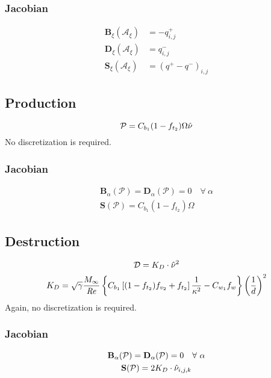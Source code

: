 \documentclass{SelimArticle}
\begin{document}
\subsubsection{Jacobian}
\begin{align*}
    \mathbf{B}_\xi(\mathcal{A}_\xi) &= -q^+_{i,j}\\
    \mathbf{D}_\xi(\mathcal{A}_\xi) &= q^-_{i,j}\\
    \mathbf{S}_\xi(\mathcal{A}_\xi) &= \left(q^+ - q^-\right)_{i,j}
\end{align*}


\subsection{Production}
$$
\mathcal{P} = C_{b_1}(1 - f_{t_2})\Omega\hat{\nu}
$$
No discretization is required.
\subsubsection{Jacobian}
\begin{gather*}
    \mathbf{B}_\alpha(\mathcal{P}) = \mathbf{D}_\alpha(\mathcal{P}) = 0 \quad \forall ~ \alpha\\
    \mathbf{S}(\mathcal{P}) = C_{b_1}(1 - f_{t_2})\Omega
\end{gather*}


\subsection{Destruction}
\begin{gather*}
    \mathcal{D} = K_D\cdot \hat{\nu}^2\\
    K_D =  \sqrt{\gamma}\frac{M_\infty}{\mathit{Re}} \left\{
        C_{b_1}\left[(1 - f_{t_2})f_{v_2} + f_{t_2}\right]\frac{1}{\kappa^2} - C_{w_1}f_w
    \right\} \left( \frac{1}{d}\right)^2
\end{gather*}
Again, no discretization is required.

\subsubsection{Jacobian}
\begin{gather*}
    \mathbf{B}_\alpha(\mathcal{P}) = \mathbf{D}_\alpha(\mathcal{P}) = 0 \quad \forall ~ \alpha\\
    \mathbf{S}(\mathcal{P}) = 2K_D \cdot \hat{\nu}_{i,j,k}
\end{gather*}
\end{document}
